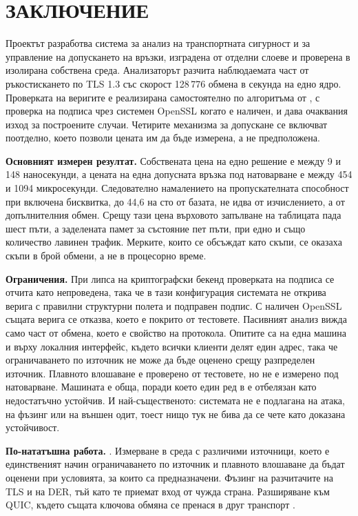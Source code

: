 \section*{ЗАКЛЮЧЕНИЕ}
\label{sec:conclusion}

Проектът разработва система за анализ на транспортната сигурност и за управление на допускането
на връзки, изградена от отделни слоеве и проверена в изолирана собствена среда. Анализаторът
разчита наблюдаемата част от ръкостискането по TLS 1.3 със скорост 128\,776 обмена в секунда на
едно ядро. Проверката на веригите е реализирана самостоятелно по алгоритъма от \cite{rfc5280}, с
проверка на подписа чрез системен OpenSSL когато е наличен, и дава очаквания изход за построените
случаи. Четирите механизма за допускане се
включват поотделно, което позволи цената им да бъде измерена, а не предположена.

\textbf{Основният измерен резултат.} Собствената цена на едно решение е между 9 и 148
наносекунди, а цената на една допусната връзка под натоварване е между 454 и 1094 микросекунди.
Следователно намалението на пропускателната способност при включена бисквитка, до 44,6 на сто от
базата, не идва от изчислението, а от допълнителния обмен. Срещу тази цена върховото запълване
на таблицата пада шест пъти, а заделената памет за състояние пет пъти, при едно и също
количество лавинен трафик. Мерките, които се обсъждат като скъпи, се оказаха скъпи в брой
обмени, а не в процесорно време.

\textbf{Ограничения.} При липса на криптографски бекенд проверката на подписа се отчита като
непроведена, така че в тази конфигурация системата не открива верига с правилни структурни полета
и подправен подпис. С наличен OpenSSL същата верига се отказва, което е покрито от тестовете.
Пасивният
анализ вижда само част от обмена, което е свойство на протокола. Опитите са на една машина и
върху локалния интерфейс, където всички клиенти делят един адрес, така че ограничаването по
източник не може да бъде оценено срещу разпределен източник. Плавното влошаване е проверено от
тестовете, но не е измерено под натоварване. Машината е обща, поради което един ред в
 е отбелязан като недостатъчно устойчив. И най-същественото: системата не е
подлагана на атака, на фъзинг или на външен одит, тоест нищо тук не бива да се чете като доказана
устойчивост.

\textbf{По-нататъшна работа.} . Измерване в
среда с различими източници, което е единственият начин ограничаването по източник и плавното
влошаване да бъдат оценени при условията, за които са предназначени. Фъзинг на разчитачите на TLS
и на DER, тъй като те приемат вход от чужда страна. Разширяване към QUIC, където същата ключова
обмяна се пренася в друг транспорт \cite{rfc9001}.
